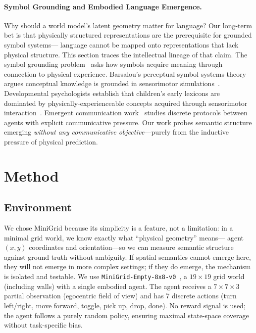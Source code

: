 \documentclass{article}
\begin{document}
\paragraph{Symbol Grounding and Embodied Language Emergence.}
Why should a world model's latent geometry matter for language?
Our long-term bet is that physically structured representations
are the prerequisite for grounded symbol systems---
language cannot be mapped onto representations that lack
physical structure. This section traces the intellectual
lineage of that claim.
The symbol grounding problem~\cite{harnad1990symbol} asks how symbols
acquire meaning through connection to physical experience.
Barsalou's perceptual symbol systems theory argues conceptual knowledge
is grounded in sensorimotor simulations~\cite{barsalou1999perceptual}.
Developmental psychologists establish that children's early lexicons
are dominated by physically-experienceable concepts acquired through
sensorimotor interaction~\cite{piaget1952origins,tomasello1999cultural}.
Emergent communication work~\cite{lazaridou2020emergent} studies discrete
protocols between agents with explicit communicative pressure.
Our work probes semantic structure emerging \emph{without any communicative
objective}---purely from the inductive pressure of physical prediction.

\section{Method}
\label{sec:method}

\subsection{Environment}
We chose MiniGrid because its simplicity is a feature, not a limitation:
in a minimal grid world, we know exactly what ``physical geometry'' means---
agent $(x,y)$ coordinates and orientation---so we can measure semantic
structure against ground truth without ambiguity.
If spatial semantics cannot emerge here, they will not emerge in more
complex settings; if they do emerge, the mechanism is isolated and testable.
We use \texttt{MiniGrid-Empty-8x8-v0}~\cite{minigrid},
a $19\times19$ grid world (including walls) with a single embodied agent.
The agent receives a $7\times7\times3$ partial observation
(egocentric field of view) and has 7 discrete actions
(turn left/right, move forward, toggle, pick up, drop, done).
No reward signal is used; the agent follows a purely random policy,
ensuring maximal state-space coverage without task-specific bias.
\end{document}
